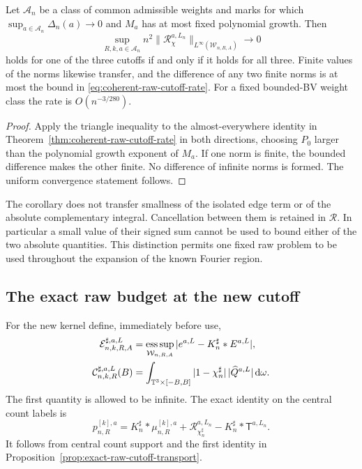 \begin{corollary}
\label{cor:one-common-raw-remainder}
Let $\mathcal A_n$ be a class of common admissible weights and marks
for which $\sup_{a\in\mathcal A_n}\Delta_n(a)\to0$ and $M_a$ has
at most fixed polynomial growth. Then
\[
 \sup_{R,k,a\in\mathcal A_n}n^2
        \|\mathcal R_\chi^{a,L_n}\|_{L^\infty(\mathcal W_{n,R,A})}
                   \longrightarrow0
\]
holds for one of the three cutoffs if and only if it holds for all
three. Finite values of the norms likewise transfer, and the difference
of any two finite norms is at most the bound in
\eqref{eq:coherent-raw-cutoff-rate}. For a fixed bounded-BV weight
class the rate is $O(n^{-3/280})$.
\end{corollary}
\begin{proof}
Apply the triangle inequality to the almost-everywhere identity in
Theorem~\ref{thm:coherent-raw-cutoff-rate} in both directions, choosing
$P_0$ larger than the polynomial growth exponent of $M_a$. If one norm
is finite, the bounded difference makes the other finite. No difference
of infinite norms is formed. The uniform convergence statement follows.
\end{proof}

The corollary does not transfer smallness of the isolated edge term or
of the absolute complementary integral. Cancellation between them is
retained in $\mathcal R$. In particular a small value of their signed
sum cannot be used to bound either of the two absolute quantities.
This distinction permits one fixed raw problem to be used throughout
the expansion of the known Fourier region.

\subsection{The exact raw budget at the new cutoff}
For the new kernel define, immediately before use,
\begin{align}
 \mathcal E^{\sharp,a,L}_{n,k,R,A}
 &=\mathop{\rm ess\,sup}_{\mathcal W_{n,R,A}}
                         |e^{a,L}-K_n^\sharp*E^{a,L}|,\notag\\
 \mathcal C^{\sharp,a,L}_{n,k,R}(B)
 &=\int_{\T^3\times[-B,B]}
           |1-\chi_n^\sharp|\,|\widehat Q^{a,L}|\dd\omega.
 \label{eq:cross-raw-terms}
\end{align}
The first quantity is allowed to be infinite. The exact identity on
the central count labels is
\begin{equation}\label{eq:cross-raw-exact-identity}
 p_{n,R}^{[k],a}=K_n^\sharp*\mu_{n,R}^{[k],a}
                  +\mathcal R_{\chi_n^\sharp}^{a,L_n}
                  -K_n^\sharp*\mathsf T^{a,L_n}.
\end{equation}
It follows from central count support and the first identity in
Proposition~\ref{prop:exact-raw-cutoff-transport}.

